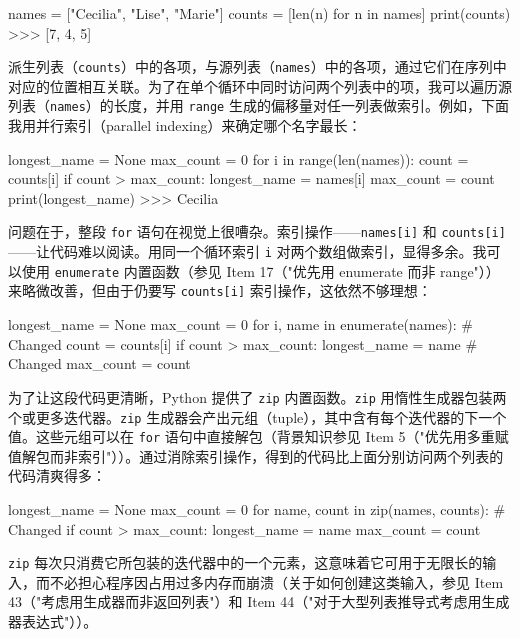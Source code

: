 \begin{codebox}[python]
names = ["Cecilia", "Lise", "Marie"]
counts = [len(n) for n in names]
print(counts)
>>>
[7, 4, 5]
\end{codebox}

派生列表（\texttt{counts}）中的各项，与源列表（\texttt{names}）中的各项，通过它们在序列中对应的位置相互关联。为了在单个循环中同时访问两个列表中的项，我可以遍历源列表（\texttt{names}）的长度，并用 \texttt{range} 生成的偏移量对任一列表做索引。例如，下面我用并行索引（parallel indexing）来确定哪个名字最长：

\begin{codebox}[python]
longest_name = None
max_count = 0
for i in range(len(names)):
    count = counts[i]
    if count > max_count:
        longest_name = names[i]
        max_count = count
print(longest_name)
>>>
Cecilia
\end{codebox}

问题在于，整段 \texttt{for} 语句在视觉上很嘈杂。索引操作——\texttt{names[i]} 和 \texttt{counts[i]}——让代码难以阅读。用同一个循环索引 \texttt{i} 对两个数组做索引，显得多余。我可以使用 \texttt{enumerate} 内置函数（参见 Item 17（"优先用 enumerate 而非 range"））来略微改善，但由于仍要写 \texttt{counts[i]} 索引操作，这依然不够理想：

\begin{codebox}[python]
longest_name = None
max_count = 0
for i, name in enumerate(names):  # Changed
    count = counts[i]
    if count > max_count:
        longest_name = name       # Changed
        max_count = count
\end{codebox}

为了让这段代码更清晰，Python 提供了 \texttt{zip} 内置函数。\texttt{zip} 用惰性生成器包装两个或更多迭代器。\texttt{zip} 生成器会产出元组（tuple），其中含有每个迭代器的下一个值。这些元组可以在 \texttt{for} 语句中直接解包（背景知识参见 Item 5（"优先用多重赋值解包而非索引"））。通过消除索引操作，得到的代码比上面分别访问两个列表的代码清爽得多：

\begin{codebox}[python]
longest_name = None
max_count = 0
for name, count in zip(names, counts):  # Changed
    if count > max_count:
        longest_name = name
        max_count = count
\end{codebox}

\texttt{zip} 每次只消费它所包装的迭代器中的一个元素，这意味着它可用于无限长的输入，而不必担心程序因占用过多内存而崩溃（关于如何创建这类输入，参见 Item 43（"考虑用生成器而非返回列表"）和 Item 44（"对于大型列表推导式考虑用生成器表达式"））。

